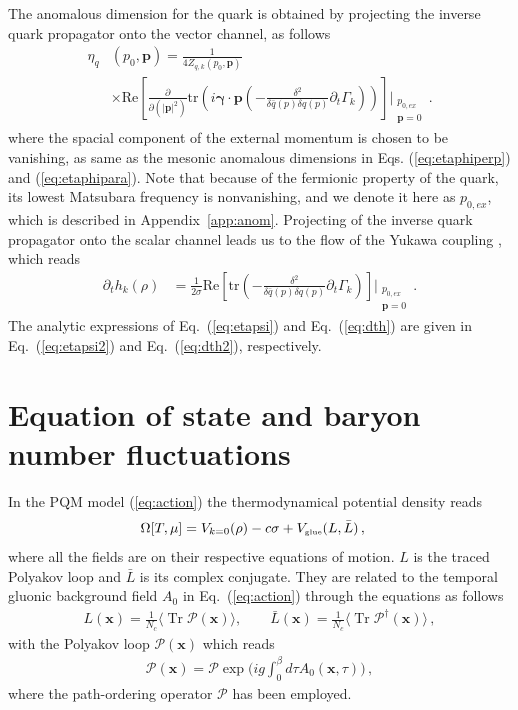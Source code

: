 \documentclass[%
reprint,
superscriptaddress,
showpacs,preprintnumbers,
 amsmath,amssymb,
 aps,
prd,
]{revtex4-1}
\newcommand{\Tr}{\ensuremath{\operatorname{Tr}}}
\def\Eq#1{Eq.~(\ref{#1})}
\def\app#1{Appendix~\ref{#1}}
\begin{document}
The anomalous dimension for the quark is obtained by projecting the inverse quark propagator onto the vector channel, as follows
\begin{align}
  \eta_{q}&(p_0,\bm{p})=\frac{1}{4 Z_{q,k}(p_0,\bm{p})}\nonumber \\[2ex]
          &\times\mathrm{Re}\left[\frac{\partial}{\partial (|\bm{p}|^2)}\mathrm{tr}
            \left(i \bm{\gamma}\cdot\bm{p}\left(-\frac{\delta^2}{\delta\bar{q}(p)
            \delta q(p)}\partial_t \Gamma_k\right)\right)\right]\Bigg|_{\substack{p_{0,ex}\\ \bm{p}=0}}\,.   \label{eq:etapsi}
\end{align}
where the spacial component of the external momentum is chosen to be vanishing, as same as the mesonic anomalous dimensions in Eqs. (\ref{eq:etaphiperp}) and (\ref{eq:etaphipara}). Note that because of the fermionic property of the quark, its lowest Matsubara frequency is nonvanishing, and we denote it here as $p_{0,ex}$, which is described in \app{app:anom}.  Projecting of the inverse quark propagator onto the scalar channel leads us to the flow of the Yukawa coupling \cite{Pawlowski:2014zaa}, which reads
\begin{align}
  \partial_t h_k(\rho)&=\frac{1}{2 \sigma}\mathrm{Re}\left[\mathrm{tr}\left(-\frac{\delta^2}{\delta\bar{q}(p)
            \delta q(p)}\partial_t \Gamma_k\right)\right]\Bigg|_{\substack{p_{0,ex}\\ \bm{p}=0}}\,.  \label{eq:dth}
\end{align}
The analytic expressions of \Eq{eq:etapsi} and \Eq{eq:dth} are given in \Eq{eq:etapsi2} and \Eq{eq:dth2}, respectively.



\section{Equation of state and baryon number fluctuations}
\label{sec:EoS}

In the PQM model (\ref{eq:action}) the thermodynamical potential density reads
\begin{align}
  \Omega[T,\mu]&=V_{k=0}(\rho)-c\sigma+V_{\text{\tiny{glue}}}(L, \bar L)\,,\label{eq:omega}
\end{align}
where all the fields are on their respective equations of motion. $L$ is the traced Polyakov loop and $\bar L$ is its complex conjugate. They are related to the temporal gluonic background field $A_0$ in \Eq{eq:action} through the equations as follows
\begin{align}
L(\bm x)=\frac{1}{N_c}\langle \Tr{\mathcal{P}(\bm x)} \rangle ,\qquad \bar{L} (\bm x)=\frac{1}{N_c}\langle \Tr{\mathcal{P}^{\dagger}(\bm x)} \rangle\,,\label{}
\end{align}
with the Polyakov loop $\mathcal{P}(\bm x)$ which reads
\begin{align}
\mathcal{P}(\bm x)=\mathcal{P}\exp\bigg( ig\int_{0}^{\beta}d\tau A_0(\bm x,\tau) \bigg)\,,\label{}
\end{align}
where the path-ordering operator $\mathcal{P}$ has been employed.
\end{document}
